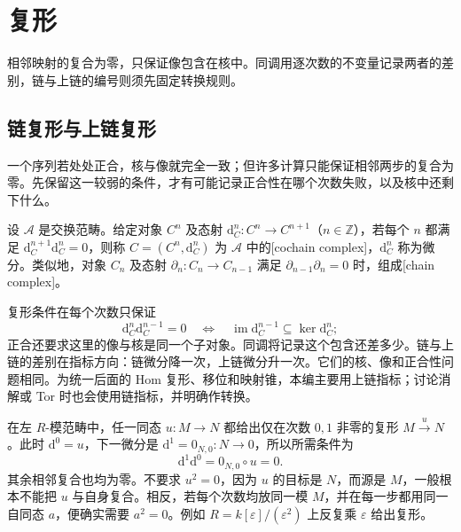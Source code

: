 
\section{复形}
\label{b4:sec:0501}

相邻映射的复合为零，只保证像包含在核中。同调用逐次数的不变量记录两者的差别，链与上链的编号则须先固定转换规则。

%
%

\subsection{链复形与上链复形}
\label{b4:subsec:0501:01}

一个序列若处处正合，核与像就完全一致；但许多计算只能保证相邻两步的复合为零。先保留这一较弱的条件，才有可能记录正合性在哪个次数失败，以及核中还剩下什么。

\begin{definition}\label{b4:def:cochain-complex}
	设 \(\mathcal A\) 是交换范畴。给定对象 \(C^n\) 及态射 \(\mathrm{d}_C^n:C^n\to C^{n+1}\)（\(n\in\mathbb Z\)），若每个 \(n\) 都满足 \(\mathrm{d}_C^{n+1}\mathrm{d}_C^n=0\)，则称 \(C=(C^n,\mathrm{d}_C^n)\) 为 \(\mathcal A\) 中的[cochain complex]，\(\mathrm{d}_C^n\) 称为微分。类似地，对象 \(C_n\) 及态射 \(\partial_n:C_n\to C_{n-1}\) 满足 \(\partial_{n-1}\partial_n=0\) 时，组成[chain complex]。
\end{definition}

复形条件在每个次数只保证
\[
	\mathrm{d}_C^n\mathrm{d}_C^{n-1}=0 \quad\Longleftrightarrow\quad \operatorname{im}\mathrm{d}_C^{n-1}\subseteq\ker\mathrm{d}_C^n;
\]
正合还要求这里的像与核是同一个子对象。同调将记录这个包含还差多少。链与上链的差别在指标方向：链微分降一次，上链微分升一次。它们的核、像和正合性问题相同。为统一后面的 Hom 复形、移位和映射锥，本编主要用上链指标；讨论消解或 Tor 时也会使用链指标，并明确作转换。

\begin{example}\label{b4:exm:two-term-complex}
	在左 \(R\)-模范畴中，任一同态 \(u:M\to N\) 都给出仅在次数 \(0,1\) 非零的复形 \(M\xrightarrow{u}N\)。此时 \(\mathrm{d}^0=u\)，下一微分是 \(\mathrm{d}^1=0_{N,0}:N\to0\)，所以所需条件为
	\[
		\mathrm{d}^1\mathrm{d}^0=0_{N,0}\circ u=0.
	\]
	其余相邻复合也均为零。不要求 \(u^2=0\)，因为 \(u\) 的目标是 \(N\)，而源是 \(M\)，一般根本不能把 \(u\) 与自身复合。相反，若每个次数均放同一模 \(M\)，并在每一步都用同一自同态 \(a\)，便确实需要 \(a^2=0\)。例如 \(R=k[\varepsilon]/(\varepsilon^2)\) 上反复乘 \(\varepsilon\) 给出复形。
\end{example}

